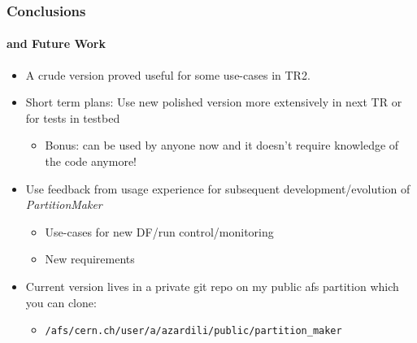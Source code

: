 \documentclass{beamer}
\begin{document}
\begin{frame}
  \frametitle{Conclusions}
  \framesubtitle{and Future Work}
  \begin{itemize}
    \item A crude version proved useful for some use-cases in TR2.

    \item Short term plans: Use new polished version more extensively
      in next TR or for tests in testbed
      \begin{itemize}
        \item Bonus: can be used by anyone now and it doesn't require knowledge of the
          code anymore!
      \end{itemize}

    \item Use feedback from usage experience for subsequent development/evolution of \textit{PartitionMaker}
     \begin{itemize}
       \item Use-cases for new DF/run control/monitoring

       \item New requirements

      \end{itemize}
     
    \item Current version lives in a private git repo on my public afs
      partition which you can clone:
      \begin{itemize}
        \item \texttt{/afs/cern.ch/user/a/azardili/public/partition\_maker}
      \end{itemize}
  \end{itemize}
\end{frame}
\end{document}
